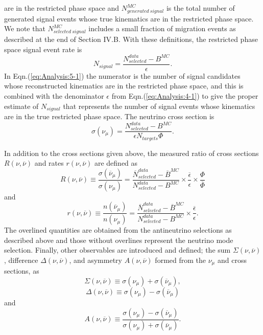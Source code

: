 are in the restricted phase space and  $N^{MC}_{generated\ signal}$ is the total number of generated 
signal events whose true kinematics are in the restricted phase space. We note that
 $N^{MC}_{selected\ signal}$ includes a small fraction of migration events
as described at the end of Section IV.B.
With these definitions, the 
restricted phase space
signal event rate is
\begin{equation}
N_{signal} = \frac{N_{selected}^{data}-B^{MC}}{\epsilon}.\label{eq:Analysis:5-1}
\end{equation}
In Eqn.(\ref{eq:Analysis:5-1}) the numerator
is the number of signal candidates whose reconstructed kinematics are in the restricted 
phase space, and this is combined with the
denominator  $\epsilon$ from Eqn.(\ref{eq:Analysis:4-1})
to give the proper estimate 
of $N_{signal}$ that represents the number of signal events 
whose kinematics are in the true restricted phase space.
The neutrino cross section is
\begin{equation}
\sigma (\nu_{\mu})=\frac{N_{selected}^{data}-B^{MC}}{\epsilon N_{targets}\Phi}.\label{eq:Analysis:6-1}
\end{equation}

In addition to the cross sections given above, the measured ratio of cross sections $R(\nu,\overline{\nu})$ and rates $r(\nu,\overline{\nu})$
are defined as
\begin{equation}
R (\nu,\overline{\nu}) \equiv \frac{\sigma(\overline{\nu}_{\mu})}{\sigma(\nu_{\mu})}=\frac{\overline{N}_{selected}^{data}-\overline{B}^{MC}}{N_{selected}^{data}-B^{MC}}\times\frac{\overline{\epsilon}}{\epsilon}\times\frac{\varPhi}{\overline{\varPhi}}\label{eq:Analysis:7-1}
\end{equation}
and
\begin{equation}
r (\nu,\overline{\nu}) \equiv \frac{n(\overline{\nu}_{\mu})}{n(\nu_{\mu})}=\frac{\overline{N}_{selected}^{data}-\overline{B}^{MC}}{N_{selected}^{data}-B^{MC}}\times\frac{\overline{\epsilon}}{\epsilon}.\label{eq:Analysis:7-2}
\end{equation}
The overlined quantities are obtained from the antineutrino
selections as described above and those without overlines represent the
neutrino mode selection.  Finally, other observables are introduced and defined; 
the sum $\Sigma(\nu,\overline{\nu})$, 
difference $\Delta(\nu,\overline{\nu})$, 
and asymmetry $A(\nu,\overline{\nu})$
formed from the $\nu_\mu$ and \nubar 
cross sections, as
\begin{equation}
\Sigma(\nu,\overline{\nu}) \equiv \sigma(\nu_{\mu})+\sigma(\overline{\nu}_{\mu}),\label{eq:Analysis:sum}
\end{equation}
\begin{equation}
\Delta(\nu,\overline{\nu}) \equiv \sigma(\nu_{\mu})-\sigma(\overline{\nu}_{\mu})\label{eq:Analysis:diff}
\end{equation}
and
\begin{equation}
A(\nu,\overline{\nu}) \equiv 
\frac{\sigma(\nu_{\mu})-\sigma(\overline{\nu}_{\mu})}{\sigma(\nu_{\mu})+\sigma(\overline{\nu}_{\mu})}.\label{eq:Analysis:asym}
\end{equation}